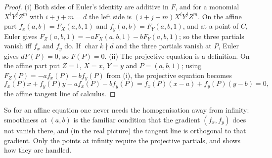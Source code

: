 \begin{proof}
(i) Both sides of Euler's identity are additive in $F$, and for a monomial $X^iY^jZ^m$ with $i+j+m=d$ the left side is $(i+j+m)X^iY^jZ^m$. On the affine
part $f_x(a,b)=F_X(a,b,1)$ and $f_y(a,b)=F_Y(a,b,1)$, and at a point of $C$, Euler gives $F_Z(a,b,1)=-aF_X(a,b,1)-bF_Y(a,b,1)$; so the three
partials vanish iff $f_x$ and $f_y$ do. If $\operatorname{char}k\nmid d$ and the three partials vanish at $P$, Euler gives $dF(P)=0$, so $F(P)=0$. (ii) The
projective equation is a definition. On the affine part put $Z=1$, $X=x$, $Y=y$ and $P=(a,b,1)$; using $F_Z(P)=-af_x(P)-bf_y(P)$ from (i), the
projective equation becomes
\[
f_x(P)x+f_y(P)y-af_x(P)-bf_y(P)=f_x(P)(x-a)+f_y(P)(y-b)=0,
\]
the affine tangent line of calculus.
\end{proof}

So for an affine equation one never needs the homogenisation away from infinity: smoothness at $(a,b)$ is the familiar condition that the gradient
$(f_x,f_y)$ does not vanish there, and (in the real picture) the tangent line is orthogonal to that gradient. Only the points at infinity require the projective partials, and
 shows how they are handled.

